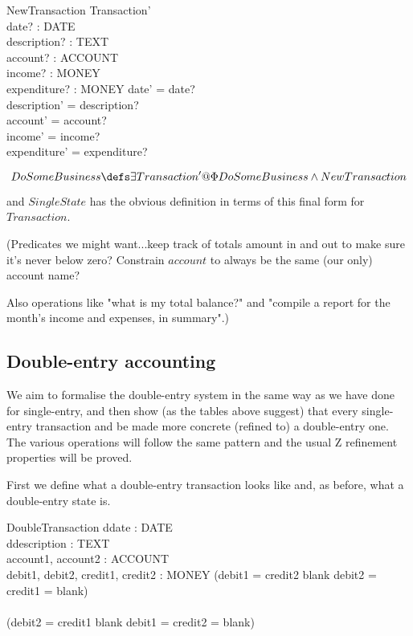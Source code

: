 \documentclass[11pt]{amsart}
\begin{document}
\begin{schema}{NewTransaction}
Transaction'\\
date? : DATE\\
description? : TEXT\\
account? : ACCOUNT\\ 
income? : MONEY\\
expenditure? : MONEY
\where
date' = date?\\
description' = description?\\
account' = account?\\
income' = income?\\
expenditure' = expenditure?
\end{schema}

\[
DoSomeBusiness \defs \exists Transaction' @ \Phi DoSomeBusiness \land NewTransaction
\]

\noindent and $SingleState$ has the obvious definition in terms of this final form for $Transaction$.


(Predicates we might want...keep track of totals amount in and out to make sure it's never below zero? Constrain $account$ to always be the same (our only) account name? 

Also operations like "what is my total balance?" and "compile a report for the month's income and expenses, in summary".)

\subsection{Double-entry accounting}

We aim to formalise the double-entry system in the same way as we have done for single-entry, and then show (as the tables above suggest) that every single-entry transaction and be made more concrete (refined to) a double-entry one. The various operations will follow the same pattern and the usual Z refinement properties will be proved. 

First we define what a double-entry transaction looks like and, as before, what a double-entry state is.  

\begin{schema}{DoubleTransaction}
ddate : DATE\\
ddescription : TEXT\\
account1, account2 : ACCOUNT\\
debit1, debit2, credit1, credit2 : MONEY
\where
(debit1 = credit2 \neq blank \land debit2 = credit1 = blank)\\
\lor\\
(debit2 = credit1 \neq blank \land debit1 = credit2 = blank) 
\end{schema}
\end{document}

